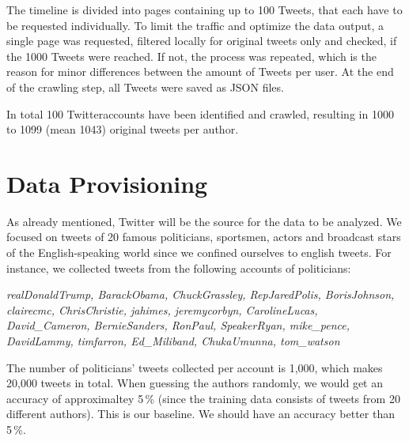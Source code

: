 \documentclass[journal, a4paper, 12pt]{IEEEtran}
\begin{document}
The timeline is divided into pages containing up to 100 Tweets, that each have to be requested individually. To limit the traffic and optimize the data output, a single page was requested, filtered locally for original tweets only and checked, if the 1000 Tweets were reached. If not, the process was repeated, which is the reason for minor differences between the amount of Tweets per user. At the end of the crawling step, all Tweets were saved as JSON files. 

In total 100 Twitteraccounts have been identified and crawled, resulting in 1000 to 1099 (mean 1043) original tweets per author.

\section{Data Provisioning}
\label{sec:provisioning}
\vspace{-2mm}
As already mentioned, Twitter will be the source for the data to be analyzed. We focused on tweets of 20 famous politicians, sportsmen, actors and broadcast stars of the English-speaking world since we confined ourselves to english tweets. For instance, we collected tweets from the following accounts of politicians:

\footnotesize
\textit{
realDonaldTrump, BarackObama, ChuckGrassley, RepJaredPolis, BorisJohnson, clairecmc, ChrisChristie, jahimes, jeremycorbyn, CarolineLucas, David\_Cameron, BernieSanders, RonPaul, SpeakerRyan, mike\_pence, DavidLammy, timfarron, Ed\_Miliband, ChukaUmunna, tom\_watson
}
\normalsize

The number of politicians' tweets collected per account is 1,000, which makes 20,000 tweets in total. When guessing the authors randomly, we would get an accuracy of approximaltey 5\,\% (since the training data consists of tweets from 20 different authors). This is our baseline. We should have an accuracy better than 5\,\%.
\end{document}
